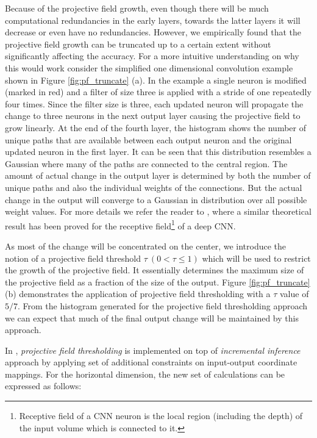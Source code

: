 Because of the projective field growth, even though there will be much computational redundancies in the early layers, towards the latter layers it will decrease or even have no redundancies.
However, we empirically found that the projective field growth can be truncated up to a certain extent without significantly affecting the accuracy.
For a more intuitive understanding on why this would work consider the simplified one dimensional convolution example shown in Figure \ref{fig:pf_truncate} (a). In the example a single neuron is modified (marked in red) and a filter of size three is applied with a stride of one repeatedly four times.
Since the filter size is three, each updated neuron will propagate the change to three neurons in the next output layer causing the projective field to grow linearly.
At the end of the fourth layer, the histogram shows the number of unique paths that are available between each output neuron and the original updated neuron in the first layer.
It can be seen that this distribution resembles a Gaussian where many of the paths are connected to the central region.
The amount of actual change in the output layer is determined by both the number of unique paths and also the individual weights of the connections.
But the actual change in the output will converge to a Gaussian in distribution over all possible weight values.
For more details we refer the reader to \cite{luo2016understanding}, where a similar theoretical result has been proved for the receptive field\footnote{Receptive field of a CNN neuron is the local region (including the depth) of the input volume which is connected to it.} of a deep CNN.

As most of the change will be concentrated on the center, we introduce the notion of a projective field threshold $\tau ~ (0 < \tau \leq 1)$ which will be used to restrict the growth of the projective field.
It essentially determines the maximum size of the projective field as a fraction of the size of the output.
Figure \ref{fig:pf_truncate} (b) demonstrates the application of projective field thresholding with a $\tau$ value of $5/7$.
From the histogram generated for the projective field thresholding approach we can expect that much of the final output change will be maintained by this approach.

In \system, \textit{projective field thresholding} is implemented on top of \textit{incremental inference} approach by applying set of additional constraints on input-output coordinate mappings. For the horizontal dimension, the new set of calculations can be expressed as follows:

